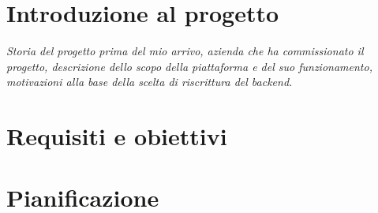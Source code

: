 \section{Introduzione al progetto}
\emph{Storia del progetto prima del mio arrivo, azienda che ha commissionato il progetto, descrizione dello scopo della piattaforma e del suo funzionamento, motivazioni alla base della scelta di riscrittura del backend.}

\section{Requisiti e obiettivi}

\section{Pianificazione}
